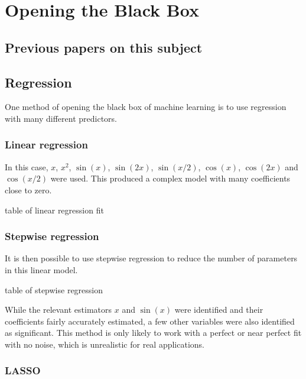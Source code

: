 
\chapter{Opening the Black Box}

\section{Previous papers on this subject}

\section{Regression}

One method of opening the black box of machine learning is to use regression with many different predictors.

\subsection{Linear regression}

In this case, \(x\), \(x^2\), \(\sin(x)\), \(\sin(2x)\), \(\sin(x/2)\), \(\cos(x)\), \(\cos(2x)\) and \(\cos(x/2)\) were used.
This produced a complex model with many coefficients close to zero.

\begin{todo}table of linear regression fit\end{todo}

\subsection{Stepwise regression}

It is then possible to use stepwise regression to reduce the number of parameters in this linear model.

\begin{todo}table of stepwise regression\end{todo}

While the relevant estimators \(x\) and \(\sin(x)\) were identified and their coefficients fairly accurately estimated, a few other variables were also identified as significant.
This method is only likely to work with a perfect or near perfect fit with no noise, which is unrealistic for real applications.

\subsection{LASSO}

